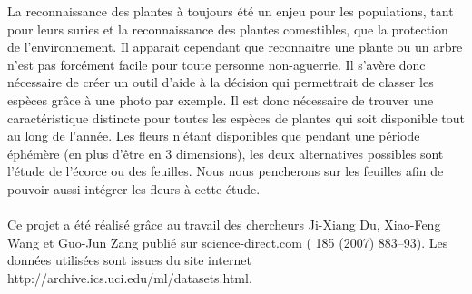 La reconnaissance des plantes à toujours été un enjeu pour les populations, tant pour leurs suries et la reconnaissance des plantes comestibles, que la protection de l'environnement.
Il apparait cependant que reconnaitre une plante ou un arbre n'est pas forcément facile pour toute personne non-aguerrie.
Il s'avère donc nécessaire de créer un outil d'aide à la décision qui permettrait de classer les espèces grâce à une photo par exemple.
Il est donc nécessaire de trouver une caractéristique distincte pour toutes les espèces de plantes qui soit disponible tout au long de l'année.
Les fleurs n'étant disponibles que pendant une période éphémère (en plus d'être en 3 dimensions), les deux alternatives possibles sont l'étude de l'écorce ou des feuilles. Nous nous pencherons sur les feuilles afin de pouvoir aussi intégrer les fleurs à cette étude.
\paragraph{}
Ce projet a été réalisé grâce au travail des chercheurs Ji-Xiang Du, Xiao-Feng Wang et Guo-Jun Zang publié sur science-direct.com ( 185 (2007) 883–93). Les données utilisées sont issues du site internet http://archive.ics.uci.edu/ml/datasets.html.